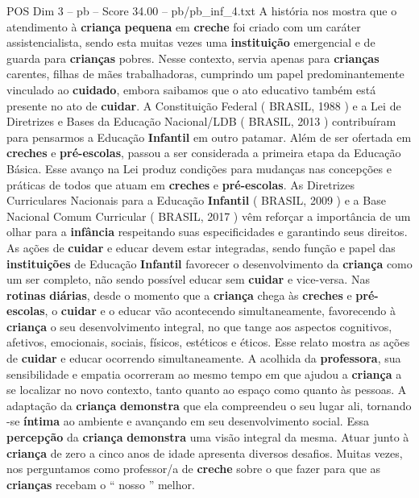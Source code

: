 \begin{textsample}{POS Dim 3 – pb – Score 34.00 – pb/pb\_inf\_4.txt}
A história nos mostra que o atendimento à \textbf{criança} \textbf{pequena} em \textbf{creche} foi criado com um caráter assistencialista, sendo esta muitas vezes uma \textbf{instituição} emergencial e de guarda para \textbf{crianças} pobres.
Nesse contexto, servia apenas para \textbf{crianças} carentes, filhas de mães trabalhadoras, cumprindo um papel predominantemente vinculado ao \textbf{cuidado}, embora saibamos que o ato educativo também está presente no ato de \textbf{cuidar}.
A Constituição Federal ( BRASIL, 1988 ) e a Lei de Diretrizes e Bases da Educação Nacional/LDB ( BRASIL, 2013 ) contribuíram para pensarmos a Educação \textbf{Infantil} em outro patamar.
Além de ser ofertada em \textbf{creches} e \textbf{pré-escolas}, passou a ser considerada a primeira etapa da Educação Básica.
Esse avanço na Lei produz condições para mudanças nas concepções e práticas de todos que atuam em \textbf{creches} e \textbf{pré-escolas}.
As Diretrizes Curriculares Nacionais para a Educação \textbf{Infantil} ( BRASIL, 2009 ) e a Base Nacional Comum Curricular ( BRASIL, 2017 ) vêm reforçar a importância de um olhar para a \textbf{infância} respeitando suas especificidades e garantindo seus direitos.
As ações de \textbf{cuidar} e educar devem estar integradas, sendo função e papel das \textbf{instituições} de Educação \textbf{Infantil} favorecer o desenvolvimento da \textbf{criança} como um ser completo, não sendo possível educar sem \textbf{cuidar} e vice-versa.
Nas \textbf{rotinas} \textbf{diárias}, desde o momento que a \textbf{criança} chega às \textbf{creches} e \textbf{pré-escolas}, o \textbf{cuidar} e o educar vão acontecendo simultaneamente, favorecendo à \textbf{criança} o seu desenvolvimento integral, no que tange aos aspectos cognitivos, afetivos, emocionais, sociais, físicos, estéticos e éticos.
Esse relato mostra as ações de \textbf{cuidar} e educar ocorrendo simultaneamente.
A acolhida da \textbf{professora}, sua sensibilidade e empatia ocorreram ao mesmo tempo em que ajudou a \textbf{criança} a se localizar no novo contexto, tanto quanto ao espaço como quanto às pessoas.
A adaptação da \textbf{criança} \textbf{demonstra} que ela compreendeu o seu lugar ali, tornando -se \textbf{íntima} ao ambiente e avançando em seu desenvolvimento social.
Essa \textbf{percepção} da \textbf{criança} \textbf{demonstra} uma visão integral da mesma.
Atuar junto à \textbf{criança} de zero a cinco anos de idade apresenta diversos desafios.
Muitas vezes, nos perguntamos como professor/a de \textbf{creche} sobre o que fazer para que as \textbf{crianças} recebam o “ nosso ” melhor.

\end{textsample}

